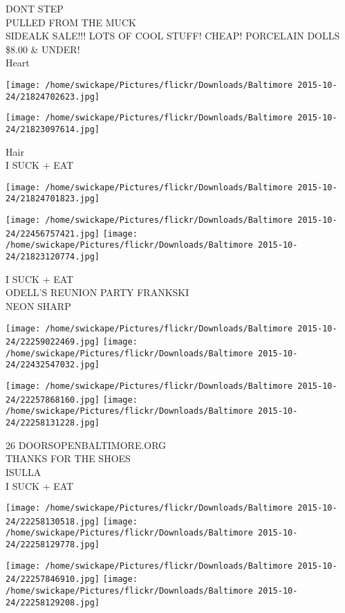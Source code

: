 \documentclass[10pt,letterpaper]{article}
\begin{document}
DONT STEP\\
PULLED FROM THE MUCK\\
SIDEALK SALE!!!  LOTS OF COOL STUFF!  CHEAP!  PORCELAIN DOLLS \$8.00 \& UNDER!\\
Heart
\pagebreak

\texttt{[image: /home/swickape/Pictures/flickr/Downloads/Baltimore 2015-10-24/21824702623.jpg]}

\vspace{0.25in}
\texttt{[image: /home/swickape/Pictures/flickr/Downloads/Baltimore 2015-10-24/21823097614.jpg]}

Hair\\
I SUCK + EAT
\pagebreak

\texttt{[image: /home/swickape/Pictures/flickr/Downloads/Baltimore 2015-10-24/21824701823.jpg]}

\vspace{0.25in}
\texttt{[image: /home/swickape/Pictures/flickr/Downloads/Baltimore 2015-10-24/22456757421.jpg]}
\texttt{[image: /home/swickape/Pictures/flickr/Downloads/Baltimore 2015-10-24/21823120774.jpg]}

I SUCK + EAT\\
ODELL'S REUNION PARTY FRANKSKI\\
NEON SHARP
\pagebreak

\texttt{[image: /home/swickape/Pictures/flickr/Downloads/Baltimore 2015-10-24/22259022469.jpg]}
\texttt{[image: /home/swickape/Pictures/flickr/Downloads/Baltimore 2015-10-24/22432547032.jpg]}

\texttt{[image: /home/swickape/Pictures/flickr/Downloads/Baltimore 2015-10-24/22257868160.jpg]}
\texttt{[image: /home/swickape/Pictures/flickr/Downloads/Baltimore 2015-10-24/22258131228.jpg]}

26 DOORSOPENBALTIMORE.ORG\\
THANKS FOR THE SHOES\\
ISULLA\\
I SUCK + EAT
\pagebreak

\texttt{[image: /home/swickape/Pictures/flickr/Downloads/Baltimore 2015-10-24/22258130518.jpg]}
\texttt{[image: /home/swickape/Pictures/flickr/Downloads/Baltimore 2015-10-24/22258129778.jpg]}

\texttt{[image: /home/swickape/Pictures/flickr/Downloads/Baltimore 2015-10-24/22257846910.jpg]}
\texttt{[image: /home/swickape/Pictures/flickr/Downloads/Baltimore 2015-10-24/22258129208.jpg]}
\end{document}
